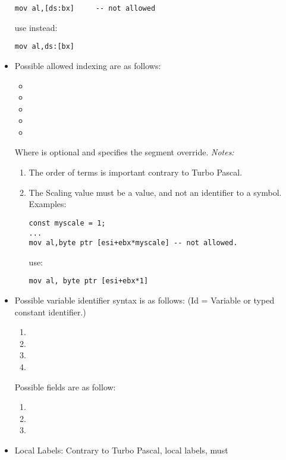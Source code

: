 \documentclass{report}
\begin{document}
\begin{itemize}
\begin{verbatim}
mov al,[ds:bx]     -- not allowed
\end{verbatim}
use instead:
\begin{verbatim}
mov al,ds:[bx]
\end{verbatim}
\item  Possible allowed indexing are as follows:
\begin{itemize}
\item    {}
\item    {}
\item    {}
\item    {}
\item    {}
\end{itemize}
Where  is optional and specifies the segment override.
{\em Notes:} 
\begin{enumerate}
\item The order of terms is important contrary to Turbo Pascal.
\item The Scaling value must be a value, and not an identifier
to a symbol.\\  Examples:
\begin{verbatim}
const myscale = 1;
...
mov al,byte ptr [esi+ebx*myscale] -- not allowed.
\end{verbatim}
use:
\begin{verbatim}
mov al, byte ptr [esi+ebx*1]
\end{verbatim}
\end{enumerate}
\item  Possible variable identifier syntax is as follows:
 (Id = Variable or typed constant identifier.)
\begin{enumerate}
\item {}
\item \var{[ID]}
\item \var{[ID+expr]}
\item {}
\end{enumerate}
 Possible fields are as follow:
\begin{enumerate}
\item  {}
\item  {}
\item  {}
\end{enumerate}
\item  Local Labels: Contrary to Turbo Pascal, local labels, must

\end{itemize}
\end{document}
